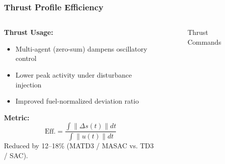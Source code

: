 \begin{frame}
  \frametitle{Thrust Profile Efficiency}
  \vspace{-0.4cm}
  \begin{columns}[T]
    \begin{column}{0.52\textwidth}
      \textbf{Thrust Usage:}
      \begin{itemize}\setlength{\itemsep}{3pt}
        \item Multi-agent (zero-sum) dampens oscillatory control
        \item Lower peak activity under disturbance injection
        \item Improved fuel-normalized deviation ratio
      \end{itemize}
      \textbf{Metric:}
      \[
        \text{Eff.} = \frac{\int \| \Delta s(t)\| dt}{\int \|u(t)\| dt}
      \]
      Reduced by 12--18\% (MATD3 / MASAC vs. TD3 / SAC).
    \end{column}
    \begin{column}{0.48\textwidth}
      \begin{figure}
        \centering
        \hfill
        \caption{\scriptsize Thrust Commands}
      \end{figure}
    \end{column}
  \end{columns}
\end{frame}




